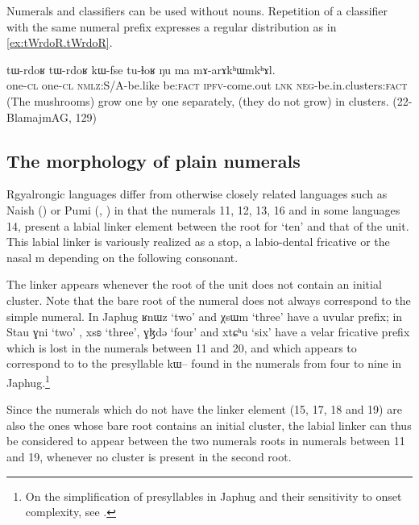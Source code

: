 \documentclass[oldfontcommands,oneside,a4paper,12pt]{article}
\newcommand{\ipa}[1]{{\phon#1}}
\begin{document}
 Numerals and classifiers can be used without nouns. Repetition of a classifier with the same numeral prefix  expresses a regular distribution as in \ref{ex:tWrdoR.tWrdoR}.
 
 \begin{exe}
\ex \label{ex:tWrdoR.tWrdoR}
\gll 
 \ipa{tɯ-rdoʁ} 	\ipa{tɯ-rdoʁ} 	\ipa{kɯ-fse} 	\ipa{tu-ɬoʁ} 	\ipa{ŋu} 	\ipa{ma} 	\ipa{mɤ-arɤkʰɯmkʰɤl.}  \\
  one-\textsc{cl}  one-\textsc{cl} \textsc{nmlz}:S/A-be.like  be:\textsc{fact} \textsc{ipfv}-come.out \textsc{lnk} \textsc{neg}-be.in.clusters:\textsc{fact} \\
 \glt (The mushrooms) grow one by one separately, (they do not grow) in clusters. (22-BlamajmAG, 129)
\end{exe}
 
 \subsection{The morphology of plain numerals}
 
 Rgyalrongic languages differ from otherwise closely related languages such as Naish (\citealt{michaud11cl}) or Pumi (\citealt[141]{daudey14grammar}, \citealt[91-2]{ding14grammar}) in that the numerals 11, 12, 13, 16  and in some languages 14, present a labial linker element between the root for `ten' and that of the unit.  
 This labial linker  is variously realized as a stop, a labio-dental fricative or the nasal \ipa{m} depending on the following consonant.
 
 The linker appears whenever  the root of the unit does not contain an initial cluster. Note that the bare root of the numeral does not always correspond to the simple numeral. In Japhug \ipa{ʁnɯz}  `two' and 	\ipa{χsɯm} `three'  have a uvular prefix; in Stau \ipa{ɣni} `two' , \ipa{xsʚ} `three', \ipa{ɣɮdə} `four' and 	\ipa{xtɕʰu} `six'  have a velar fricative prefix which is lost in the numerals between 11 and 20, and which appears to correspond  to  to the presyllable \ipa{kɯ--} found in the numerals from four to nine in Japhug.\footnote{On the simplification of presyllables in Japhug and their sensitivity to onset complexity, see \citet{jacques14antipassive}.}
 
Since the numerals which do not have the linker element (15, 17, 18 and 19) are also the ones whose bare root contains an initial cluster, the labial linker can thus be considered to appear between the two numerals roots in numerals between 11 and 19, whenever no cluster is present in the second root.
 
\end{document}
